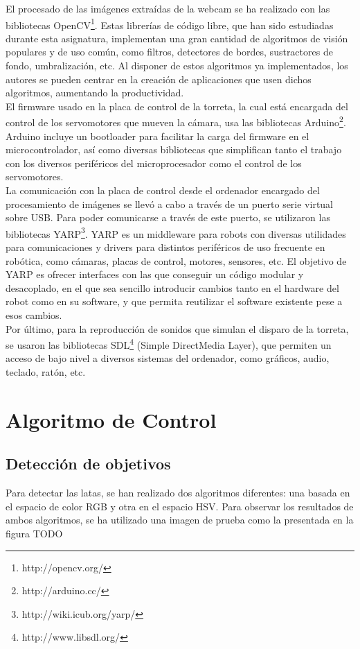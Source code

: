 El procesado de las imágenes extraídas de la webcam se ha realizado con las bibliotecas OpenCV\footnote{http://opencv.org/}. Estas librerías de código libre, que han sido estudiadas durante esta asignatura, implementan una gran cantidad de algoritmos de visión populares y de uso común, como filtros, detectores de bordes, sustractores de fondo, umbralización, etc. Al disponer de estos algoritmos ya implementados, los autores se pueden centrar  en la creación de aplicaciones que usen dichos algoritmos, aumentando la productividad.\\

El firmware usado en la placa de control de la torreta, la cual está encargada del control de los servomotores que mueven la cámara, usa las bibliotecas Arduino\footnote{http://arduino.cc/}. Arduino incluye un bootloader para facilitar la carga del firmware en el microcontrolador, así como diversas bibliotecas que simplifican tanto el trabajo con los diversos periféricos del microprocesador como el control de los servomotores.\\

La comunicación con la placa de control desde el ordenador encargado del procesamiento de imágenes se llevó a cabo a través de un puerto serie virtual sobre USB. Para poder comunicarse a través de este puerto, se utilizaron las bibliotecas YARP\footnote{http://wiki.icub.org/yarp/}. YARP es un middleware para robots con diversas utilidades para comunicaciones y drivers para distintos periféricos de uso frecuente en robótica, como cámaras, placas de control, motores, sensores, etc. El objetivo de YARP es ofrecer interfaces con las que conseguir un código modular y desacoplado, en el que sea sencillo introducir cambios tanto en el hardware del robot como en su software, y que permita reutilizar el software existente pese a esos cambios.\\

Por último, para la reproducción de sonidos que simulan el disparo de la torreta, se usaron las bibliotecas SDL\footnote{http://www.libsdl.org/} (Simple DirectMedia Layer), que permiten un acceso de bajo nivel a diversos sistemas del ordenador, como gráficos, audio, teclado, ratón, etc.\\

\newpage

\section{Algoritmo de Control}
\subsection{Detección de objetivos}
Para detectar las latas, se han realizado dos algoritmos diferentes: una basada en el espacio de color RGB y otra en el espacio HSV. Para observar los resultados de ambos algoritmos, se ha utilizado una imagen de prueba como la presentada en la figura TODO\\

